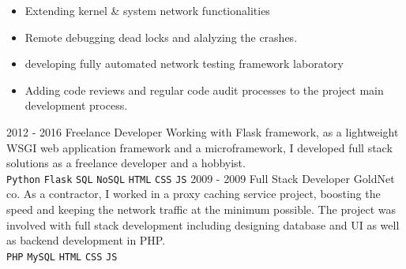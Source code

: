 \documentclass[12pt]{developercv}
\begin{document}
\begin{entrylist}
{		%
		\begin{itemize}
			\itemsep0em
			\item Extending kernel \& system network functionalities
			\item Remote debugging dead locks and alalyzing the crashes.
			\item developing fully automated network testing framework laboratory
			\item Adding code reviews and regular code audit processes to the project
			      main development process.
		\end{itemize}
		}
	\entry
		{2012 - 2016}
		{Freelance Developer}
		{}
		{
		Working with Flask framework, as a lightweight WSGI web application
		framework and a microframework, I developed full stack solutions as a
		freelance developer and a hobbyist. 
		\\
		\texttt{Python}\slashsep
		\texttt{Flask}\slashsep
		\texttt{SQL}\slashsep
		\texttt{NoSQL}\slashsep
		\texttt{HTML}\slashsep
		\texttt{CSS}\slashsep
		\texttt{JS}
		}
	\entry
		{2009 - 2009}
		{Full Stack Developer}
		{GoldNet co.}
		{
		As a contractor, I worked in a proxy caching service project, boosting the
		speed and keeping the network traffic at the minimum possible. The project
		was involved with full stack development including designing database and UI
		as well as backend development in PHP.
		\\
		\texttt{PHP}\slashsep
		\texttt{MySQL}\slashsep
		\texttt{HTML}\slashsep
		\texttt{CSS}\slashsep
		\texttt{JS}
		}
\end{entrylist}

\end{document}
